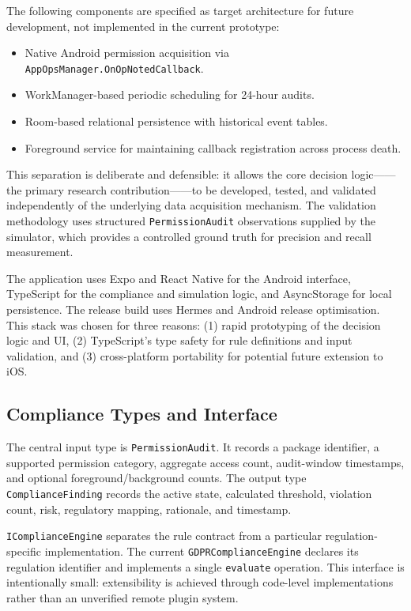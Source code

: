 The following components are specified as target architecture for future development, not implemented in the current prototype:

\begin{itemize}
\item Native Android permission acquisition via \texttt{AppOpsManager.OnOpNotedCallback}.
\item WorkManager-based periodic scheduling for 24-hour audits.
\item Room-based relational persistence with historical event tables.
\item Foreground service for maintaining callback registration across process death.
\end{itemize}

This separation is deliberate and defensible: it allows the core decision logic——the primary research contribution——to be developed, tested, and validated independently of the underlying data acquisition mechanism. The validation methodology uses structured \texttt{PermissionAudit} observations supplied by the simulator, which provides a controlled ground truth for precision and recall measurement.

The application uses Expo and React Native for the Android interface, TypeScript for the compliance and simulation logic, and AsyncStorage for local persistence. The release build uses Hermes and Android release optimisation. This stack was chosen for three reasons: (1) rapid prototyping of the decision logic and UI, (2) TypeScript's type safety for rule definitions and input validation, and (3) cross-platform portability for potential future extension to iOS.

\subsection{Compliance Types and Interface}

The central input type is \texttt{PermissionAudit}. It records a package identifier, a supported permission category, aggregate access count, audit-window timestamps, and optional foreground/background counts. The output type \texttt{ComplianceFinding} records the active state, calculated threshold, violation count, risk, regulatory mapping, rationale, and timestamp.

\texttt{IComplianceEngine} separates the rule contract from a particular regulation-specific implementation. The current \texttt{GDPRComplianceEngine} declares its regulation identifier and implements a single \texttt{evaluate} operation. This interface is intentionally small: extensibility is achieved through code-level implementations rather than an unverified remote plugin system.

